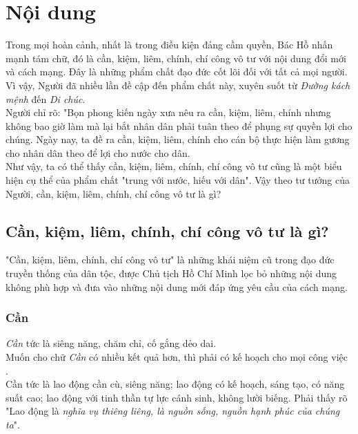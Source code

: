 \section{Nội dung}
Trong mọi hoàn cảnh, nhất là trong điều kiện đảng cầm quyền, Bác Hồ nhấn mạnh tám chữ, đó là cần, kiệm, liêm, chính, chí công vô tư với nội dung đổi mới và cách mạng. Đây là những phẩm chất đạo đức cốt lõi đối với tất cả mọi người. \cite{soiduong} Vì vậy, Người đã nhiều lần đề cập đến phẩm chất này, xuyên suốt từ \textit{Đường kách mệnh} đến \textit{Di chúc}.\\
Người chỉ rõ: "Bọn phong kiến ngày xưa nêu ra cần, kiệm, liêm, chính nhưng không bao giờ làm mà lại bắt nhân dân phải tuân theo để phụng sự quyền lợi cho chúng. Ngày nay, ta đề ra cần, kiệm, liêm, chính cho cán bộ thực hiện làm gương cho nhân dân theo để lợi cho nước cho dân. \cite{HCMtt7}\\
Như vậy, ta có thể thấy cần, kiệm, liêm, chính, chí công vô tư cũng là một biểu hiện cụ thể của phẩm chất "trung với nước, hiếu với dân". \cite{syllabus}
Vậy theo tư tưởng của Người, cần, kiệm, liêm, chính, chí công vô tư là gì?

\subsection{Cần, kiệm, liêm, chính, chí công vô tư là gì?}
"Cần, kiệm, liêm, chính, chí công vô tư" là những khái niệm cũ trong đạo đức truyền thống của dân tộc, được Chủ tịch Hồ Chí Minh lọc bỏ những nội dung không phù hợp và đưa vào những nội dung mới đáp ứng yêu cầu của cách mạng. \cite{syllabus}

\subsubsection{Cần}
\textit{Cần} tức là siêng năng, chăm chỉ, cố gắng dẻo dai. \cite{HCMtt6}\\
Muốn cho chữ \textit{Cần} có nhiều kết quả hơn, thì phải có kế hoạch cho mọi công việc \cite{HCMtt6}.\\
Cần tức là lao động cần cù, siêng năng; lao động có kế hoạch, sáng tạo, có năng suất cao; lao động với tinh thần tự lực cánh sinh, không lười biếng. Phải thấy rõ "Lao động là \textit{nghĩa vụ thiêng liêng, là nguồn sống, nguồn hạnh phúc của chúng ta}"\cite{HCMtt13}.\\

